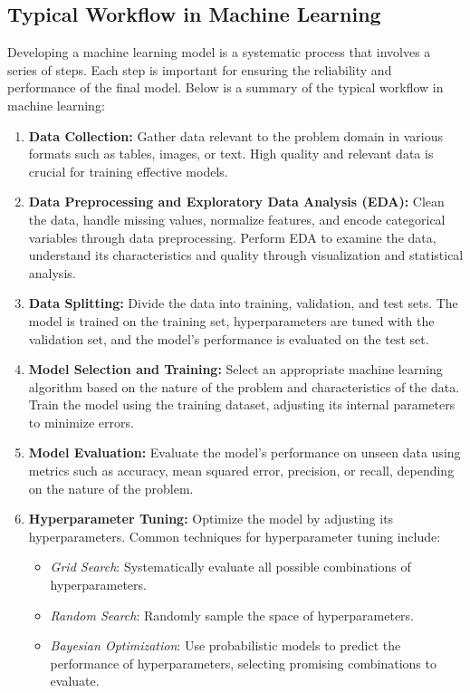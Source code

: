 \subsection{Typical Workflow in Machine Learning}
Developing a machine learning model is a systematic process that involves a series of steps. Each step is important for ensuring the reliability and performance of the final model. Below is a summary of the typical workflow in machine learning:

\begin{enumerate}
    \item \textbf{Data Collection:} Gather data relevant to the problem domain in various formats such as tables, images, or text. High quality and relevant data is crucial for training effective models.
    
    \item \textbf{Data Preprocessing and Exploratory Data Analysis (EDA):} Clean the data, handle missing values, normalize features, and encode categorical variables through data preprocessing. Perform EDA to examine the data, understand its characteristics and quality through visualization and statistical analysis.
    
    \item \textbf{Data Splitting:} Divide the data into training, validation, and test sets. The model is trained on the training set, hyperparameters are tuned with the validation set, and the model's performance is evaluated on the test set.
    
    \item \textbf{Model Selection and Training:} Select an appropriate machine learning algorithm based on the nature of the problem and characteristics of the data. Train the model using the training dataset, adjusting its internal parameters to minimize errors.
    
    \item \textbf{Model Evaluation:} Evaluate the model's performance on unseen data using metrics such as accuracy, mean squared error, precision, or recall, depending on the nature of the problem.
    
    \item \textbf{Hyperparameter Tuning:} Optimize the model by adjusting its hyperparameters. Common techniques for hyperparameter tuning include:
    \begin{itemize}
        \item \textit{Grid Search}: Systematically evaluate all possible combinations of hyperparameters.
        \item \textit{Random Search}: Randomly sample the space of hyperparameters.
        \item \textit{Bayesian Optimization}: Use probabilistic models to predict the performance of hyperparameters, selecting promising combinations to evaluate.
    \end{itemize}
\end{enumerate}


